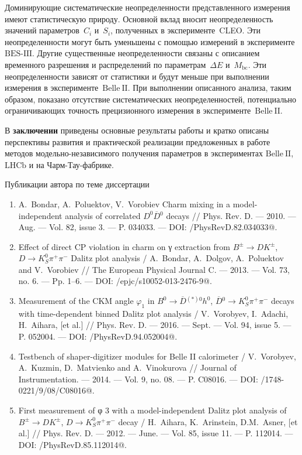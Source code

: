 \documentclass[a4paper,14pt]{extarticle} %
\newcommand{\dn}{\ensuremath{D^0}\xspace}
\newcommand{\bn}{\ensuremath{B^0}\xspace}
\newcommand{\hn}{\ensuremath{h^0}\xspace}
\newcommand{\dbar}{\ensuremath{\overline{D}}\xspace}
\newcommand{\dnbar}{\ensuremath{\dbar{}^0}\xspace}
\newcommand{\dstarnbar}{\ensuremath{\dbar{}^{(*)0}}\xspace}
\newcommand{\ks}{\ensuremath{K_S^0}\xspace}
\newcommand{\bdk}{\ensuremath{B^{\pm}\to D K^{\pm}}\xspace}
\newcommand{\mbc}{\ensuremath{M_{\mathrm{bc}}}\xspace}
\newcommand{\de}{\ensuremath{\Delta E}\xspace}
\newcommand{\dkpp}{\ensuremath{D\to\ks\pi^+\pi^-}\xspace}
\newcommand{\dbkpp}{\ensuremath{\dnbar\to\ks\pi^+\pi^-}\xspace}
\newcommand{\bdsth}{\ensuremath{\bn\to\dstarnbar\hn}\xspace}
\newcommand{\ci}{\ensuremath{C_i}\xspace}
\newcommand{\si}{\ensuremath{S_i}\xspace}
\newcommand{\belle}{\ensuremath{\mathrm{Belle}}\xspace}
\newcommand{\belleii}{\ensuremath{\belle\:\mathrm{II}}\xspace}
\newcommand{\lhcb}{\ensuremath{\mathrm{LHCb}}\xspace}
\newcommand{\besiii}{\ensuremath{\textrm{BES-III}}\xspace}
\begin{document}
Доминирующие систематические неопределенности представленного измерения имеют статистическую природу.  Основной вклад вносит неопределенность значений параметров~\ci и~\si, полученных в эксперименте~CLEO.  Эти неопределенности могут быть уменьшены с помощью измерений в эксперименте~\besiii.  Другие существенные неопределенности связаны с описанием временного разрешения и распределений по параметрам~\de и~\mbc.  Эти неопределенности зависят от статистики и будут меньше при выполнении измерения в эксперименте~\belleii.  При выполнении описанного анализа, таким образом, показано отсутствие систематических неопределенностей, потенциально ограничивающих точность прецизионного измерения в эксперименте~\belleii.

В {\textbf{заключении}} приведены основные результаты работы и кратко описаны перспективы развития и практической реализации предложенных в работе методов модельно-независимого получения параметров в экспериментах \belleii, \lhcb и на Чарм-Тау-фабрике.

\large{Публикации автора по теме диссертации}

\begin{enumerate}
 \item A.~Bondar, A.~Poluektov, V.~Vorobiev Charm mixing in a model-independent analysis of correlated $\dn\dnbar$ decays // Phys. Rev. D. --- 2010. --- Aug. --- Vol. 82, issue 3. --- P. 034033. --- DOI: /PhysRevD.82.034033@.
 \item Effect of direct CP violation in charm on γ extraction from $\bdk$, $\dkpp$ Dalitz plot analysis / A.~Bondar, A.~Dolgov, A.~Poluektov and V.~Vorobiev // The European Physical Journal C. --- 2013. --- Vol. 73, no. 6. --- Pp. 1--6. --- DOI: /epjc/s10052-013-2476-9@.
 \item Measurement of the CKM angle $\varphi_1$ in $\bdsth$, $\dbkpp$ decays with time-dependent binned Dalitz plot analysis / V.~Vorobyev, I.~Adachi, H.~Aihara, [et al.] // Phys. Rev. D. --- 2016. --- Sept. --- Vol. 94, issue 5. --- P. 052004. --- DOI: /PhysRevD.94.052004@.
 \item Testbench of shaper-digitizer modules for Belle II calorimeter / V.~Vorobyev, A.~Kuzmin, D.~Matvienko and A.~Vinokurova // Journal of Instrumentation. --- 2014. --- Vol. 9, no. 08. --- P. C08016. --- DOI: /1748-0221/9/08/C08016@.
 \item First measurement of φ 3 with a model-independent Dalitz plot analysis of $\bdk$, $\dkpp$ decay / H.~Aihara, K.~Arinstein, D.M.~Asner, [et al.] // Phys. Rev. D. --- 2012. --- June. --- Vol. 85, issue 11. --- P. 112014. --- DOI: /PhysRevD.85.112014@.
\end{enumerate}
\end{document}
